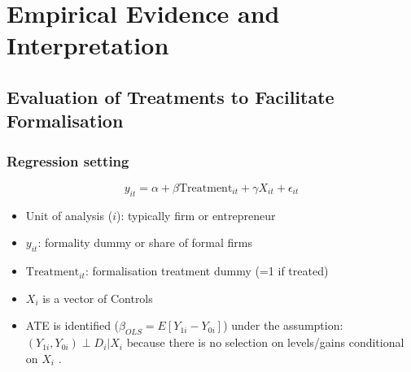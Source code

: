 \section{Empirical Evidence and Interpretation}

    \subsection{Evaluation of Treatments to Facilitate Formalisation}
        \subsubsection{Regression setting}
            \begin{equation}
                y_{it}=\alpha+ \beta \text{Treatment}_{it} +\gamma X_{it}+\epsilon_{it}
                \label{eqn:formality regression 1}
            \end{equation}
            \begin{itemize}
                \item Unit of analysis ($i$): typically firm or entrepreneur
                \item $y_{it}$: formality dummy or share of formal firms
                \item $\text{Treatment}_{it}$: formalisation treatment dummy (=1 if treated)
                \item $X_i$ is a vector of Controls
                \item ATE is identified ($\beta_{OLS} = E[Y_{1i}-Y_{0i}]$) under the assumption: $(Y_{1i},Y_{0i}) \perp D_i|X_i$ because there is no selection on levels/gains conditional on $X_i$
.            \end{itemize}
